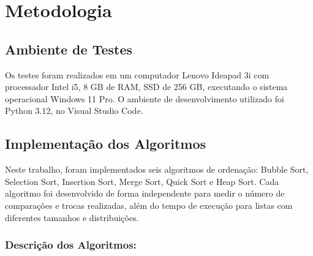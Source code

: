 \documentclass[12pt, a4paper]{report}
\begin{document}
\chapter{Metodologia}
\section{Ambiente de Testes}
Os testes foram realizados em um computador Lenovo Ideapad 3i com processador Intel i5, 8 GB de RAM, SSD de 256 GB, executando o sistema operacional Windows 11 Pro. O ambiente de desenvolvimento utilizado foi Python 3.12, no Visual Studio Code.

\section{Implementação dos Algoritmos}
Neste trabalho, foram implementados seis algoritmos de ordenação: Bubble Sort,
Selection Sort, Insertion Sort, Merge Sort, Quick Sort e Heap Sort. Cada algoritmo foi
desenvolvido de forma independente para medir o número de comparações e trocas
realizadas, além do tempo de execução para listas com diferentes tamanhos e distribuições.
\subsection*{Descrição dos Algoritmos:}
\end{document}
